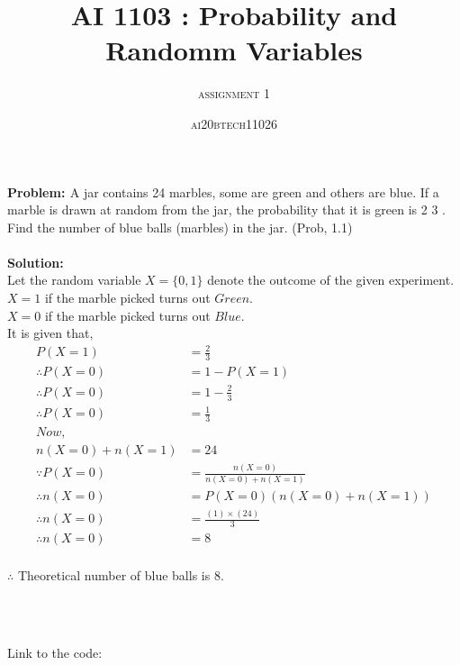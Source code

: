 \documentclass{article}
\title{\textbf{AI 1103 : Probability and Randomm Variables}}
\author{\textsc{assignment 1}}
\date{\textsc{ai20btech11026}}
\begin{document}
\maketitle
\textbf{\large{Problem: }}A jar contains 24 marbles, some are green and others are blue. If a marble is drawn at random
from the jar, the probability that it is green is 2 3 . Find the number of blue balls (marbles) in the jar. (Prob, 1.1)
\\\\\textbf{\large{Solution:}}
\\\indent Let the random variable $X = \{ 0,1 \}$ denote the outcome of the given experiment.
\\$X = 1$ if the marble picked turns out $Green$.
\\$X = 0$ if the marble picked turns out $Blue$.
\\It is given that,
\begin{align*}
P(X = 1) &= \frac{2}{3}\\
\therefore{} P(X = 0) &= 1 - P(X = 1)\\
\therefore{} P(X = 0) &= 1 - \frac{2}{3}\\
\therefore{} P(X = 0) &= \frac{1}{3}\\
Now,\\
n(X = 0) + n(X = 1) &= 24\\
\because P(X = 0) &= \frac{n(X = 0)}{n(X = 0) + n(X = 1)}\\
\therefore{} n(X = 0) &= P(X = 0)\left(n(X = 0) + n(X = 1)\right)\\
\therefore{} n(X = 0) &= \frac{(1)\times (24)}{3}\\
\therefore{} n(X = 0) &= 8
\end{align*}
\\$\therefore{}$ Theoretical number of blue balls is 8.


\\\\{Link to the code:

}
\end{document}
